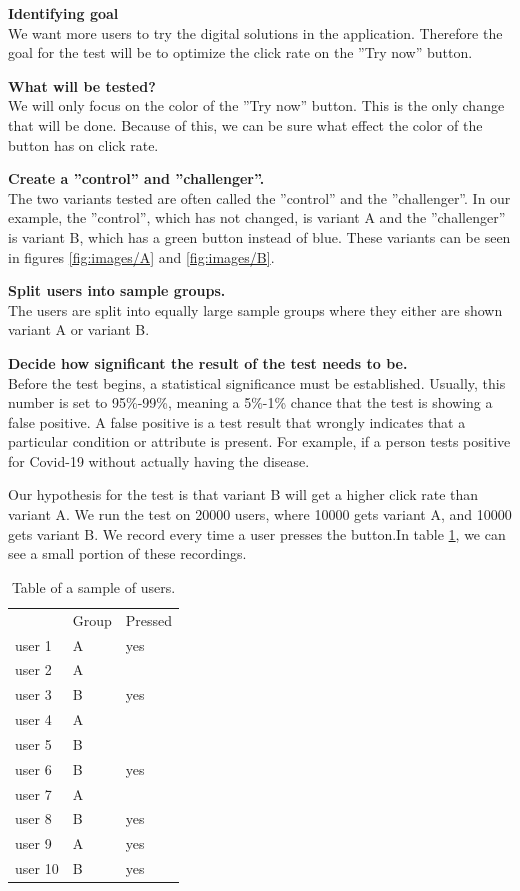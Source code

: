 \textbf{Identifying goal} \\
We want more users to try the digital solutions in the application. Therefore the goal for the test will be to optimize the click rate on the ''Try now'' button.

\textbf{What will be tested?}\\
We will only focus on the color of the ''Try now'' button. This is the only change that will be done. Because of this, we can be sure what effect the color of the button has on click rate. 

\textbf{Create a ''control'' and ''challenger''. }\\
The two variants tested are often called the ''control'' and the ''challenger''. In our example, the ''control'', which has not changed, is variant A and the ''challenger'' is variant B, which has a green button instead of blue. These variants can be seen in figures \ref{fig:images/A} and \ref{fig:images/B}.

\textbf{Split users into sample groups.}\\
The users are split into equally large sample groups where they either are shown variant A or variant B. 

\textbf{Decide how significant the result of the test needs to be.}\\
Before the test begins, a statistical significance must be established. Usually, this number is set to 95\%-99\%, meaning a 5\%-1\% chance that the test is showing a false positive. A false positive is a test result that wrongly indicates that a particular condition or attribute is present. For example, if a person tests positive for Covid-19 without actually having the disease.



Our hypothesis for the test is that variant B will get a higher click rate than variant A. We run the test on 20000 users, where 10000 gets variant A, and 10000 gets variant B. We record every time a user presses the button.In table \ref{tab:ab}, we can see a small portion of these recordings.

\begin{table}[H]
  \centering
\begin{tabular}{|l|l|l|}
\cline{1-3} 
        & Group & Pressed \\\cline{1-3} 
user 1  & A     & yes     \\\cline{1-3} 
user 2  & A     &         \\\cline{1-3} 
user 3  & B     & yes     \\\cline{1-3} 
user 4  & A     &         \\\cline{1-3} 
user 5  & B     &         \\\cline{1-3} 
user 6  & B     & yes     \\\cline{1-3} 
user 7  & A     &         \\\cline{1-3} 
user 8  & B     & yes     \\\cline{1-3} 
user 9  & A     & yes     \\\cline{1-3} 
user 10 & B     & yes     \\\cline{1-3}  
\end{tabular}
\caption{Table of a sample of users.}
\label{tab:ab}
\end{table}

